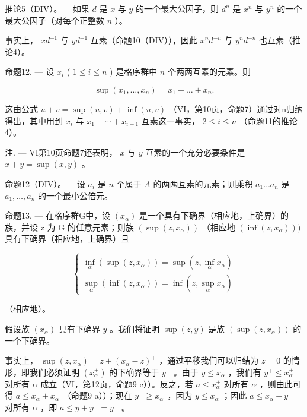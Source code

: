 推论5（DIV）。--- 如果 \(d\) 是 \(x\) 与 \(y\) 的一个最大公因子，则 \(d^n\) 是 \(x^n\) 与 \(y^n\) 的一个最大公因子（对每个正整数 \(n\) ）。

事实上， \(xd^{-1}\) 与 \(yd^{-1}\) 互素（命题10（DIV）），因此 \(x^{n}d^{-n}\) 与 \(y^{n}d^{-n}\) 也互素（推论4）。

命题12. --- 设 \(x_{i}\) ( \(1 \leqslant i \leqslant n\) ) 是格序群中 \(n\) 个两两互素的元素。则

\[
\sup \left(x _ {1}, \dots , x _ {n}\right) = x _ {1} + \dots + x _ {n}.
\]

这由公式 \(u + v = \sup(u, v) + \inf(u, v)\) （VI，第10页，命题7）通过对n归纳得出，其中用到 \(x_{i}\) 与 \(x_{1} + \cdots + x_{i-1}\) 互素这一事实， \(2 \leqslant i \leqslant n\) （命题11的推论4）。

注. --- VI第10页命题7还表明， \(x\) 与 \(y\) 互素的一个充分必要条件是 \(x + y = \sup(x, y)\) 。

命题12（DIV）。--- 设 \(a_i\) 是 \(n\) 个属于 \(A\) 的两两互素的元素；则乘积 \(a_1 \ldots a_n\) 是 \(a_1, \ldots, a_n\) 的一个最小公倍元。

命题13. --- 在格序群G中，设 \((x_{\alpha})\) 是一个具有下确界（相应地，上确界）的族，并设 z 为 G 的任意元素；则族 \((\sup(z, x_{\alpha}))\) （相应地 \((\inf(z, x_{\alpha})))\) 具有下确界（相应地，上确界）且

\[
\left\{ \begin{array}{l} \inf _ {\alpha} (\sup (z, x _ {\alpha})) = \sup \left(z, \inf _ {\alpha} x _ {\alpha}\right) \\ \sup _ {\alpha} (\inf (z, x _ {\alpha})) = \inf \left(z, \sup _ {\alpha} x _ {\alpha}\right) \end{array} \right.\tag{4}
\]

（相应地）。

假设族 \((x_{\alpha})\) 具有下确界 \(y\) 。我们将证明 \(\sup (z,y)\) 是族 \((\sup (z,x_{\alpha}))\) 的一个下确界。

事实上， \(\sup (z, x_{\alpha}) = z + (x_{\alpha} - z)^{+}\) ，通过平移我们可以归结为 \(z = 0\) 的情形，即我们必须证明 \((x_{\alpha}^{+})\) 的下确界等于 \(y^{+}\) 。由于 \(y \leqslant x_{\alpha}\) ，我们有 \(y^{+} \leqslant x_{\alpha}^{+}\) 对所有 \(\alpha\) 成立（VI，第12页，命题9 c））。反之，若 \(a \leqslant x_{\alpha}^{+}\) 对所有 \(\alpha\) ，则由此可得 \(a \leqslant x_{\alpha} + x_{\alpha}^{-}\) （命题9 a））；现在 \(y^{-} \geqslant x_{\alpha}^{-}\) ，因为 \(y \leqslant x_{\alpha}\) ；因此 \(a \leqslant x_{\alpha} + y^{-}\) 对所有 \(\alpha\) ，即 \(a \leqslant y + y^{-} = y^{+}\) 。

